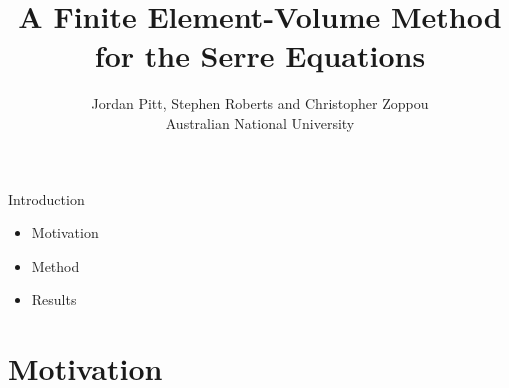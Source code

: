 \documentclass[pdf]{beamer}
\title{A Finite Element-Volume Method for the Serre Equations}
\author{Jordan Pitt, Stephen Roberts and Christopher Zoppou \\ Australian National University}
\begin{document}
\begin{frame}
\titlepage
\end{frame}

 
\begin{frame}{Introduction}
\begin{itemize}
	\item Motivation
	\pause
	\item Method
	\pause
	\item Results
\end{itemize}
\end{frame}
\section{Motivation}
\end{document}
